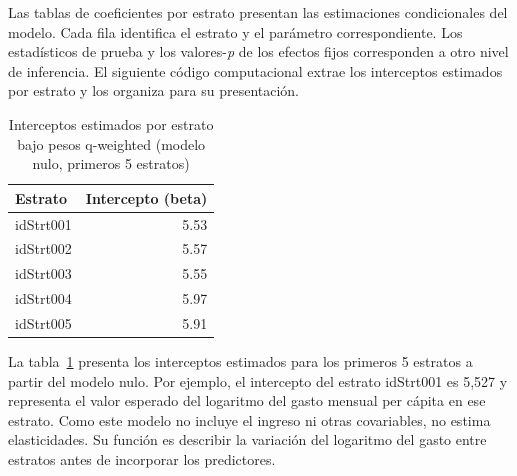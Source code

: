 \documentclass[
  spanish,
  11pt,
  letterpaper,
  oneside,
  open=any]{scrbook}
\newenvironment{Shaded}{\begin{snugshade}}{\end{snugshade}}
\newcommand{\AttributeTok}[1]{\textcolor[rgb]{0.40,0.45,0.13}{#1}}
\newcommand{\DecValTok}[1]{\textcolor[rgb]{0.68,0.00,0.00}{#1}}
\newcommand{\FunctionTok}[1]{\textcolor[rgb]{0.28,0.35,0.67}{#1}}
\newcommand{\NormalTok}[1]{\textcolor[rgb]{0.00,0.23,0.31}{#1}}
\newcommand{\OtherTok}[1]{\textcolor[rgb]{0.00,0.23,0.31}{#1}}
\newcommand{\SpecialCharTok}[1]{\textcolor[rgb]{0.37,0.37,0.37}{#1}}
\newcommand{\StringTok}[1]{\textcolor[rgb]{0.13,0.47,0.30}{#1}}
\begin{document}
Las tablas de coeficientes por estrato presentan las estimaciones
condicionales del modelo. Cada fila identifica el estrato y el parámetro
correspondiente. Los estadísticos de prueba y los valores-\emph{p} de
los efectos fijos corresponden a otro nivel de inferencia. El siguiente
código computacional extrae los interceptos estimados por estrato y los
organiza para su presentación.

\begin{Shaded}
\end{Shaded}

{

\begin{longtable}[]{@{}lr@{}}

\caption{\label{tbl-interceptos-nulos}Interceptos estimados por estrato
bajo pesos q-weighted (modelo nulo, primeros 5 estratos)}

\tabularnewline

\toprule\noalign{}
Estrato & Intercepto (beta) \\
\midrule\noalign{}
\endhead
\bottomrule\noalign{}
\endlastfoot
idStrt001 & 5.53 \\
idStrt002 & 5.57 \\
idStrt003 & 5.55 \\
idStrt004 & 5.97 \\
idStrt005 & 5.91 \\

\end{longtable}

}

La tabla~\ref{tbl-interceptos-nulos} presenta los interceptos estimados
para los primeros 5 estratos a partir del modelo nulo. Por ejemplo, el
intercepto del estrato idStrt001 es 5,527 y representa el valor esperado
del logaritmo del gasto mensual per cápita en ese estrato. Como este
modelo no incluye el ingreso ni otras covariables, no estima
elasticidades. Su función es describir la variación del logaritmo del
gasto entre estratos antes de incorporar los predictores.
\end{document}
